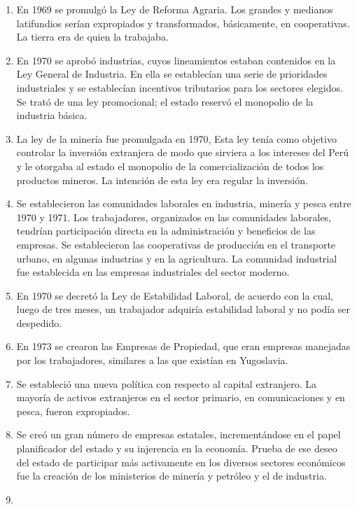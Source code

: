 \documentclass[
  letterpaper,
  DIV=11,
  numbers=noendperiod]{scrartcl}
\providecommand{\tightlist}{%
  \setlength{\itemsep}{0pt}\setlength{\parskip}{0pt}}\usepackage{longtable,booktabs,array}
\begin{document}
\begin{enumerate}
\def\labelenumi{\arabic{enumi}.}
\tightlist
\item
  En 1969 se promulgó la Ley de Reforma Agraria. Los grandes y medianos
  latifundios serían expropiados y transformados, básicamente, en
  cooperativas. La tierra era de quien la trabajaba.
\item
  En 1970 se aprobó industrias, cuyos lineamientos estaban contenidos en
  la Ley General de Industria. En ella se establecían una serie de
  prioridades industriales y se establecían incentivos tributarios para
  los sectores elegidos. Se trató de una ley promocional; el estado
  reservó el monopolio de la industria básica.
\item
  La ley de la minería fue promulgada en 1970, Esta ley tenía como
  objetivo controlar la inversión extranjera de modo que sirviera a los
  intereses del Perú y le otorgaba al estado el monopolio de la
  comercialización de todos los productos mineros. La intención de esta
  ley era regular la inversión.
\item
  Se establecieron las comunidades laborales en industria, minería y
  pesca entre 1970 y 1971. Los trabajadores, organizados en las
  comunidades laborales, tendrían participación directa en la
  administración y beneficios de las empresas. Se establecieron las
  cooperativas de producción en el transporte urbano, en algunas
  industrias y en la agricultura. La comunidad industrial fue
  establecida en las empresas industriales del sector moderno.
\item
  En 1970 se decretó la Ley de Estabilidad Laboral, de acuerdo con la
  cual, luego de tres meses, un trabajador adquiría estabilidad laboral
  y no podía ser despedido.
\item
  En 1973 se crearon las Empresas de Propiedad, que eran empresas
  manejadas por los trabajadores, similares a las que existían en
  Yugoslavia.
\item
  Se estableció una nueva política con respecto al capital extranjero.
  La mayoría de activos extranjeros en el sector primario, en
  comunicaciones y en pesca, fueron expropiados.
\item
  Se creó un gran número de empresas estatales, incrementándose en el
  papel planificador del estado y su injerencia en la economía. Prueba
  de ese deseo del estado de participar más activamente en los diversos
  sectores económicos fue la creación de los ministerios de minería y
  petróleo y el de industria.
\item

\end{enumerate}
\end{document}
